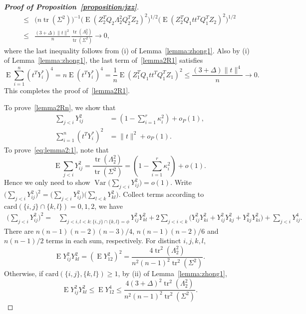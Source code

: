 \documentclass[3p]{elsarticle}
\DeclareMathOperator{\mytr}{tr}
\DeclareMathOperator{\myE}{E}
\DeclareMathOperator{\myVar}{Var}
\theoremstyle{plain}
\theoremstyle{definition}
\theoremstyle{remark}
\begin{document}
\begin{proof}[\textbf{Proof of Proposition~\ref{proposition:jxz}}]
$$\begin{aligned}
    \leq&
    \big( n \mytr(\Sigma^2)\big)^{-1} 
    \big(\myE (Z_2^T Q_2 \Lambda_2^2 Q_2^T Z_2)^2\big)^{1/2} \big(\myE(Z_2^T Q_1 t t^T Q_1^T Z_2)^2\big)^{1/2}\\
    \leq&
     \frac{(3+\Delta) \|t\|^2}{n} 
    \frac{\mytr (\Lambda_2^2)}{\mytr(\Sigma^2)}\to 0,
\end{aligned}
$$
    where the last inequality follows from (i) of Lemma~\ref{lemma:zhong1}. 
    Also by (i) of Lemma~\ref{lemma:zhong1}, the last term of~\eqref{lemma2R1} satisfies 
$$
        \myE\sum_{i=1}^n (t^T Y_i^*)^4=n \myE (t^T Y_i^*)^4
=\frac{1}{n} \myE (Z_1^T Q_1 t t^T Q_1^T Z_1)^2
\leq \frac{(3+\Delta)\|t\|^4}{n}\to 0.
$$
This completes the proof of~\eqref{lemma2R1}.



To prove~\eqref{lemma2Rn}, we show that
\begin{align}
    \sum_{j<i} Y_{ij}^2&= (1-\sum_{i=1}^r \kappa_i^2)+o_P(1),
    \label{eq:lemma2:1}
    \\
    \sum_{i=1}^n (t^T Y_i^*)^2&=\|t\|^2 +o_P(1).
    \label{eq:lemma2:2}
\end{align}
To prove~\eqref{eq:lemma2:1}, note that
$$
    \myE \sum_{j<i} Y_{ij}^2= \frac{\mytr(\Lambda_2^2)}{\mytr(\Sigma^2)}=(1-\sum_{i=1}^r \kappa_i^2)+o(1).
$$
    Hence we only need to show $\myVar\big(\sum_{j<i} Y_{ij}^2)=o(1)$. 
    Write $\big(\sum_{j<i}Y_{ij}^2\big)^2=
        \big(\sum_{j<i}Y_{ij}^2\big)
        \big(\sum_{l<k}Y_{kl}^2\big)$.
    Collect terms according to $\mathrm{card}(\{i,j\}\cap\{k,l\})=0,1,2$, we have
    \begin{equation*}%
    \begin{aligned}
        \big(\sum_{j<i}Y_{ij}^2\big)^2
        =&
        \sum_{j<i,l<k:\{i,j\}\cap \{k,l\}=\phi}Y_{ij}^2 Y_{kl}^2
        +2\sum_{j<i<k}\Big(
        Y_{ij}^2 Y_{ki}^2+
        Y_{ij}^2 Y_{kj}^2
        +
        Y_{kj}^2 Y_{ki}^2
        \Big)
         +
        \sum_{j<i}Y_{ij}^4.
    \end{aligned}
    \end{equation*}
    There are  $n(n-1)(n-2)(n-3)/4$, $n(n-1)(n-2)/6$ and $n(n-1)/2$ terms in each sum, respectively.
    For distinct $i,j,k,l$, 
    $$\myE Y_{ij}^2 Y_{kl}^2=(\myE Y_{12}^2)^2=\frac{4\mytr^2(\Lambda_2^2)}{n^2(n-1)^2\mytr^2(\Sigma^2)}.$$
    Otherwise, if $\text{card}(\{i,j\},\{k,l\})\geq 1$, by (ii) of Lemma~\ref{lemma:zhong1},
    $$\myE Y_{ij}^2 Y_{kl}^2\leq \myE Y_{12}^4\leq \frac{4(3+\Delta)^2\mytr^2(\Lambda_2^2)}{n^2(n-1)^2\mytr^2(\Sigma^2)}.$$

\end{proof}
\end{document}
